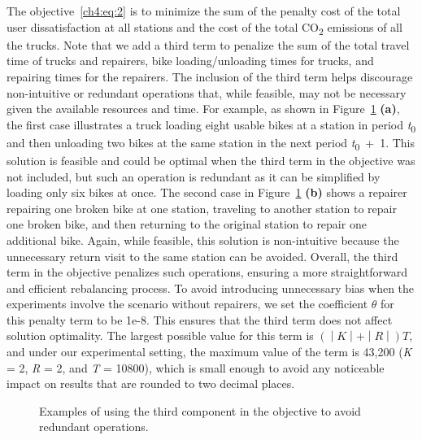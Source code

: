 The objective~\eqref{ch4:eq:2} is to minimize the sum of the penalty cost of the total user dissatisfaction at
all stations and the cost of the total CO\textsubscript{2} emissions of all the trucks. Note that we
add a third term to penalize the sum of the total travel time of trucks and repairers, bike
loading/unloading times for trucks, and repairing times for the repairers. The inclusion of the
third term helps discourage non-intuitive or redundant operations that, while feasible, may not be
necessary given the available resources and time. For example, as shown in Figure~\ref{ch4:fig:redundant-operations} \textbf{(a)},
the first case illustrates a truck loading eight usable bikes at a station in period
\emph{t}\textsubscript{0} and then unloading two bikes at the same station in the next period
\emph{t}\textsubscript{0}~+~1. This solution is feasible and could be optimal when the third term in
the objective was not included, but such an operation is redundant as it can be simplified by
loading only six bikes at once. The second case in Figure~\ref{ch4:fig:redundant-operations} \textbf{(b)} shows a repairer repairing
one broken bike at one station, traveling to another station to repair one broken bike, and then
returning to the original station to repair one additional bike. Again, while feasible, this
solution is non-intuitive because the unnecessary return visit to the same station can be avoided.
Overall, the third term in the objective penalizes such operations, ensuring a more straightforward
and efficient rebalancing process. To avoid introducing unnecessary bias when the experiments
involve the scenario without repairers, we set the coefficient \emph{\(\theta\)} for this penalty term to be
1e-8. This ensures that the third term does not affect solution optimality. The largest possible
value for this term is \(\left( \middle| K \middle| + \middle| R \middle| \right)T\), and under our
experimental setting, the maximum value of the term is 43,200 (\textbar{}\emph{K}\textbar{} = 2,
\textbar{}\emph{R}\textbar{} = 2, and \emph{T} = 10800), which is small enough to avoid any
noticeable impact on results that are rounded to two decimal places.

\begin{figure}[htbp]
\centering
{}
\caption{Examples of using the third component in the objective to avoid redundant operations.}
\label{ch4:fig:redundant-operations}
\end{figure}

